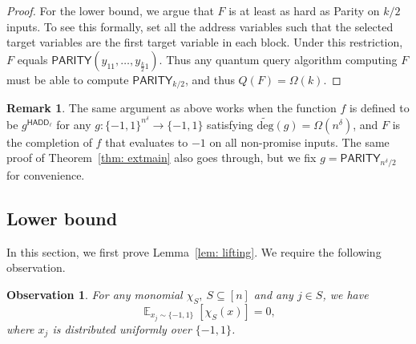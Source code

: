 \documentclass[10pt,a4paper]{article}
\newtheorem{observation}[theorem]{Observation}
\theoremstyle{definition}
\newtheorem{remark}[theorem]{Remark}
\newcommand{\bra}[1]{\{#1\}}
\newcommand{\pmone}{\bra{-1,1}}
\newcommand{\adeg}{\widetilde{\mathrm{deg}}}
\newcommand{\HADD}{\mathsf{HADD}}
\newcommand{\PARITY}{\mathsf{PARITY}}
\DeclareMathOperator*{\Exp}{\mathbb E}
\begin{document}
\begin{proof}
For the lower bound, we argue that $F$ is at least as hard as Parity on $k/2$ inputs. To see this formally, set all the address variables such that the selected target variables are the first target variable in each block.  Under this restriction, $F$ equals $\mathsf{PARITY}(y_{11}, \dots, y_{\frac{k}{2}1})$.  Thus any quantum query algorithm computing $F$ must be able to compute $\mathsf{PARITY}_{k/2}$, and thus $Q(F)=\Omega(k)$.
\end{proof}

\begin{remark}\label{rmk: outer}
The same argument as above works when the function $f$ is defined to be $g^{\HADD_\ell}$ for any $g : \pmone^{n^{\delta}} \to \pmone$ satisfying $\adeg(g) = \Omega(n^{\delta})$, and $F$ is the completion of $f$ that evaluates to $-1$ on all non-promise inputs.  The same proof of Theorem~\ref{thm: extmain} also goes through, but we fix $g = \PARITY_{n^{\delta}/2}$ for convenience.
\end{remark}

\subsection{Lower bound}\label{sec: lower}

In this section, we first prove Lemma~\ref{lem: lifting}.
We require the following observation.
\begin{observation}\label{obs: obs}
For any monomial $\chi_S,~S\subseteq [n]$ and any $j\in S$, we have 
\[
\Exp_{x_j \sim \pmone}[\chi_S(x)] = 0,
\]
where $x_j$ is distributed uniformly over $\pmone$.
\end{observation}
\end{document}
